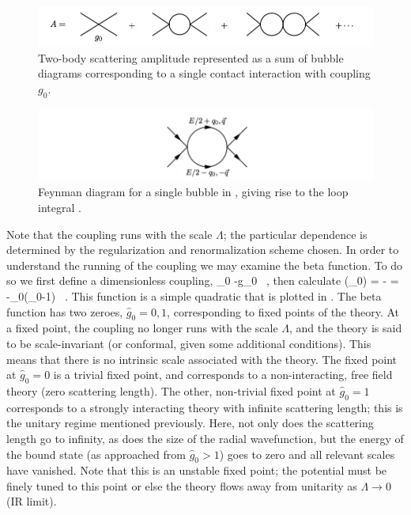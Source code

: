\begin{figure}
\begin{center}
\includegraphics[width=\linewidth]{Chapter5-figures/simple1}
\caption{\label{fig:bubblesum}Two-body scattering amplitude represented as a sum of bubble diagrams corresponding to a single contact interaction with coupling $g_0$.}
\end{center}
\end{figure}
\begin{figure}
\begin{center}
\includegraphics[width=\linewidth]{Chapter5-figures/loop1}
\caption{\label{fig:loop}Feynman diagram for a single bubble in , giving rise to the loop integral .}
\end{center}
\end{figure}

Note that the coupling runs with the scale $\Lambda$; the particular dependence is determined by the regularization and renormalization scheme chosen. In order to understand the running of the coupling we may examine the beta function. To do so we first define a dimensionless coupling,
\beq
{}_0 \equiv -g_0 \ ,
\eeq
then calculate
\beq
\label{eq:beta}
\beta\left(_0\right) \equiv \Lambda {} = - = -_0\left(_0-1\right) \ .
\eeq
This function is a simple quadratic that is plotted in . The beta function has two zeroes, $\hat{g}_0 = 0,1$, corresponding to fixed points of the theory. At a fixed point, the coupling no longer runs with the scale $\Lambda$, and the theory is said to be scale-invariant (or conformal, given some additional conditions). This means that there is no intrinsic scale associated with the theory. The fixed point at $\hat{g}_0=0$ is a trivial fixed point, and corresponds to a non-interacting, free field theory (zero scattering length). The other, non-trivial fixed point at $\hat{g}_0=1$ corresponds to a strongly interacting theory with infinite scattering length; this is the unitary regime mentioned previously. Here, not only does the scattering length go to infinity, as does the size of the radial wavefunction, but the energy of the bound state (as approached from $\hat{g}_0 > 1$) goes to zero and all relevant scales have vanished. Note that this is an unstable fixed point; the potential must be finely tuned to this point or else the theory flows away from unitarity as $\Lambda \to 0$ (IR limit).

